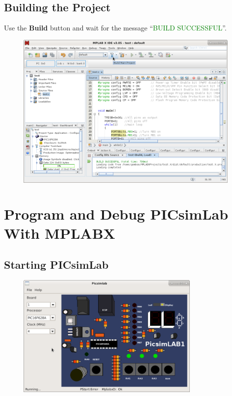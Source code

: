 \subsection{Building the Project}

Use the \textbf{Build} button and wait for the message ``\textcolor{green}{BUILD SUCCESSFUL}''.

\begin{figure}[H]
\center
\includegraphics[width=0.98\textwidth]{img/hmd/mplab23.png} 
\end{figure} 



\section{Program and Debug PICsimLab With MPLABX}


\subsection{Starting PICsimLab}
\begin{figure}[H]
\center
\includegraphics[width=0.8\textwidth]{img/hmd/mplab24.png} 
\end{figure} 

